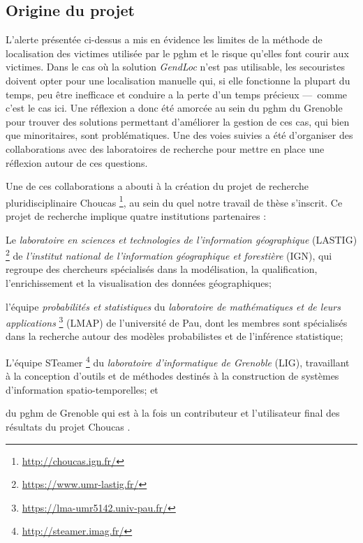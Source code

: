 \subsection{Origine du projet}
\label{subsec:1-2-1}

L’alerte présentée ci-dessus a mis en évidence les limites de la
méthode de localisation des victimes utilisée par le \ac{pghm} et le
risque qu'elles font courir aux victimes. Dans le cas où la solution
\emph{GendLoc} n'est pas utilisable, les secouristes doivent opter
pour une localisation manuelle qui, si elle fonctionne la plupart du
temps, peu être inefficace et conduire a la perte d'un temps précieux
---~comme c'est le cas ici. Une réflexion a donc été amorcée au sein
du \ac{pghm} du Grenoble pour trouver des solutions permettant
d'améliorer la gestion de ces cas, qui bien que minoritaires, sont
problématiques. Une des voies suivies a été d'organiser des
collaborations avec des laboratoires de recherche pour mettre en place
une réflexion autour de ces questions.

Une de ces collaborations a abouti à la création du projet de
recherche pluridisciplinaire Choucas
\footnote{\url{http://choucas.ign.fr/}}, au sein du quel notre travail
de thèse s'inscrit. Ce projet de recherche implique quatre
institutions partenaires :
%
\begin{enumerate*}[label=(\arabic*)]
\item Le \emph{laboratoire en sciences et technologies de
    l'information géographique} (LASTIG)
  \footnote{\url{https://www.umr-lastig.fr/}} de \emph{l'institut
    national de l'information géographique et forestière} (IGN), qui
  regroupe des chercheurs spécialisés dans la modélisation, la
  qualification, l'enrichissement et la visualisation des données
  géographiques;
\item l'équipe \emph{probabilités et statistiques} du
  \emph{laboratoire de mathématiques et de leurs applications}
  \footnote{\url{https://lma-umr5142.univ-pau.fr/}} (LMAP) de
  l'université de Pau, dont les membres sont spécialisés dans la
  recherche autour des modèles probabilistes et de l'inférence
  statistique;
\item L'équipe STeamer \footnote{\url{http://steamer.imag.fr/}} du
  \emph{laboratoire d'informatique de Grenoble} (LIG), travaillant à
  la conception d'outils et de méthodes destinés à la construction de
  systèmes d'information spatio-temporelles; et
\item du \ac{pghm} de Grenoble qui est à la fois un contributeur et
  l'utilisateur final des résultats du projet Choucas
  \autocite{Choucas2020}.
\end{enumerate*}

